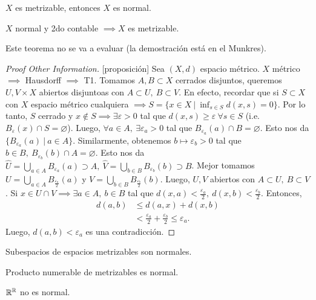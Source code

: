 \begin{prop}
	$X$ es metrizable, entonces $X$ es normal.
\end{prop}

\begin{theorem}
	$X$ normal y 2do contable $\implies X$ es metrizable.
\end{theorem}
\begin{note}
	Este teorema no se va a evaluar (la demostración está en el Munkres).
\end{note}

\begin{proof}[Proof Other Information][proposición]
	Sea $(X,d)$ espacio métrico. $X$ métrico $\implies$ Hausdorff $\implies$ T1. Tomamos $A, B \subset X$ cerrados disjuntos, queremos $U, V \times X$ abiertos disjuntoas con $A \subset U,\ B \subset V$. En efecto, recordar que si $S \subset X$ con $X$ espacio métrico cualquiera $\implies S = \{x \in X \ \big| \ \inf_{s \in S} d(x,s) = 0\}$. Por lo tanto, $S$ cerrado y $x \not\in S \implies \exists \varepsilon > 0$ tal que  $d(x,s) \geq \varepsilon \ \forall s \in S$ (i.e. $B_{\varepsilon}(x) \cap S = \varnothing$). Luego, $\forall a \in A,\ \exists \varepsilon_{a} > 0$ tal que $B_{\varepsilon_{a}}(a) \cap B = \varnothing$. Esto nos da $\{B_{\varepsilon_{a}}(a) \ \big| \ a \in A\}$. Similarmente, obtenemos $b \mapsto \varepsilon_{b} > 0$ tal que $b \in B,\ B_{\varepsilon_{b}}(b) \cap A = \varnothing$. Esto nos da $\widehat{U} = \bigcup_{a \in A} B_{\varepsilon_{a}}(a) \supset A, \ \widehat{V} = \bigcup_{b \in B} B_{\varepsilon_{b}}(b) \supset B$. Mejor tomamos $U = \bigcup_{a \in A} B_{\frac{\varepsilon_{a}}{2}}(a)$ y $V = \bigcup_{b \in B} B_{\frac{\varepsilon_{b}}{2}}(b)$. Luego, $U, V$ abiertos con $A \subset U,\ B \subset V$. Si $x \in U \cap V \implies \exists a \in A,\ b \in B$ tal que $d(x,a) < \frac{\varepsilon_{a}}{2},\ d(x,b) < \frac{\varepsilon_{b}}{2}$. Entonces,
	\begin{align*}
		d(a,b) &\leq d(a,x) + d(x,b) \\
		&< \frac{\varepsilon_{a}}{2} + \frac{\varepsilon_{b}}{2} \leq \varepsilon_{a}
	.\end{align*}
	Luego, $d(a,b) < \varepsilon_{a}$ es una contradicción.
\end{proof}

\begin{corollary}
	Subespacios de espacios metrizables son normales.
\end{corollary}

\begin{corollary}
	Producto numerable de metrizables es normal.
\end{corollary}

\begin{remark}
	$\mathbb{R}^{\mathbb{R}}$ no es normal.
\end{remark}
